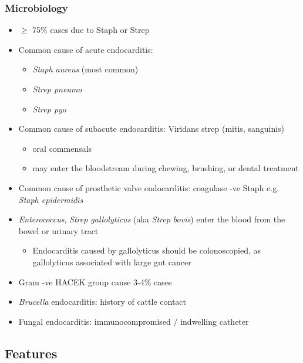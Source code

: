 \documentclass[
  12pt,
]{memoir}
\providecommand{\tightlist}{%
  \setlength{\itemsep}{0pt}\setlength{\parskip}{0pt}}
\begin{document}
\hypertarget{microbiology}{%
\subsubsection{Microbiology}\label{microbiology}}

\begin{itemize}
\tightlist
\item
  \(\ge\) 75\% cases due to Staph or Strep
\item
  Common cause of acute endocarditis:

  \begin{itemize}
  \tightlist
  \item
    \emph{Staph aureus} (most common)
  \item
    \emph{Strep pneumo}
  \item
    \emph{Strep pyo}
  \end{itemize}
\item
  Common cause of subacute endocarditis: Viridans strep (mitis,
  sanguinis)

  \begin{itemize}
  \tightlist
  \item
    oral commensals
  \item
    may enter the bloodstream during chewing, brushing, or dental
    treatment
  \end{itemize}
\item
  Common cause of prosthetic valve endocarditis: coagulase -ve Staph
  e.g. \emph{Staph epidermidis}
\item
  \emph{Enterococcus}, \emph{Strep gallolyticus} (aka \emph{Strep
  bovis}) enter the blood from the bowel or urinary tract

  \begin{itemize}
  \tightlist
  \item
    Endocarditis caused by gallolyticus should be colonoscopied, as
    gallolyticus associated with large gut cancer
  \end{itemize}
\item
  Gram -ve HACEK group cause 3-4\% cases
\item
  \emph{Brucella} endocarditis: history of cattle contact
\item
  Fungal endocarditis: immunocompromised / indwelling catheter
\end{itemize}

\hypertarget{features-11}{%
\subsection{Features}\label{features-11}}
\end{document}
